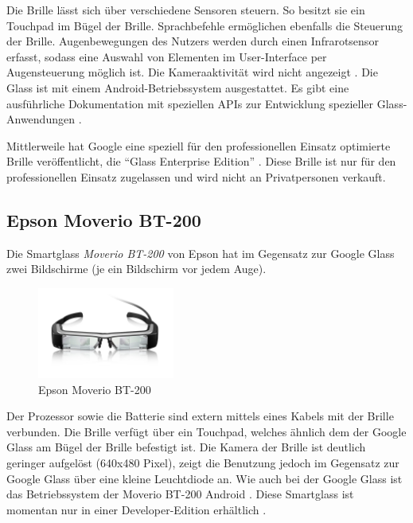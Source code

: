 Die Brille lässt sich über verschiedene Sensoren steuern. So besitzt sie ein Touchpad im Bügel der Brille. Sprachbefehle ermöglichen ebenfalls die Steuerung der Brille. Augenbewegungen des Nutzers werden durch einen Infrarotsensor erfasst, sodass eine Auswahl von Elementen im User-Interface per Augensteuerung möglich ist. Die Kameraaktivität wird nicht angezeigt \cite[S.~30]{Schwenke2016}. Die Glass ist mit einem Android-Betriebssystem ausgestattet. Es gibt eine ausführliche Dokumentation mit speziellen APIs zur Entwicklung spezieller Glass-Anwendungen \cite{Google2018b}.

Mittlerweile hat Google eine speziell für den professionellen Einsatz optimierte Brille veröffentlicht, die \enquote{Glass Enterprise Edition} \cite{Inc.2018}. Diese Brille ist nur für den professionellen Einsatz zugelassen und wird nicht an Privatpersonen verkauft. 
%
%
%
%
%
%
%
\subsection{Epson Moverio BT-200}
\label{sec:Epson_Moverio_BT-200}
Die Smartglass \emph{Moverio BT-200} von Epson hat im Gegensatz zur Google Glass zwei Bildschirme (je ein Bildschirm vor jedem Auge). 
%
\begin{figure}[htbp]
    \centering
    \includegraphics[width=0.4\textwidth]{data/bilder/Moverio_BT-200.png}
    \caption{Epson Moverio BT-200 \cite{Epson}}
    \label{fig:BT-200}
\end{figure}
%
Der Prozessor sowie die Batterie sind extern mittels eines Kabels mit der Brille verbunden. Die Brille verfügt über ein Touchpad, welches ähnlich dem der Google Glass am Bügel der Brille befestigt ist. Die Kamera der Brille ist deutlich geringer aufgelöst (640x480 Pixel), zeigt die Benutzung jedoch im Gegensatz zur Google Glass über eine kleine Leuchtdiode an. Wie auch bei der Google Glass ist das Betriebssystem der Moverio BT-200 Android \cite[S.~32]{Schwenke2016}. Diese Smartglass ist momentan nur in einer Developer-Edition erhältlich \cite{Epson}.
%
%
%
%
%
%
